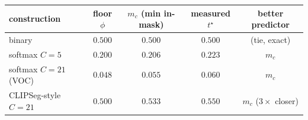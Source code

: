 \documentclass[11pt]{article}
\theoremstyle{remark}
\begin{document}
\begin{center}
\small
\begin{tabular}{lcccc}
\toprule
construction & floor $\phi$ & $m_c$ (min in-mask) & measured $t^\star$ & better predictor \\
\midrule
binary                & $0.500$ & $0.500$ & $0.500$ & (tie, exact) \\
softmax $C=5$         & $0.200$ & $0.206$ & $0.223$ & $m_c$ \\
softmax $C=21$ (VOC)  & $0.048$ & $0.055$ & $0.060$ & $m_c$ \\
CLIPSeg-style $C=21$  & $0.500$ & $0.533$ & $0.550$ & $m_c$ ($3\times$ closer) \\
\bottomrule
\end{tabular}
\end{center}
\end{document}
